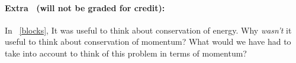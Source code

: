 \documentclass[12pt]{article}
\begin{document}
\paragraph{Extra \problemname\ (will not be graded for credit):}%
In \problemname~\ref{blocks}, It was useful to think about
conservation of energy. Why \emph{wasn't} it useful to think about
conservation of momentum? What would we have had to take into account
to think of this problem in terms of momentum?
\end{document}
